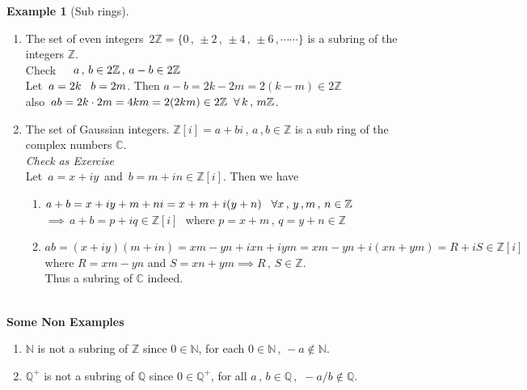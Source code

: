 \documentclass[11pt,a4paper]{article}
\theoremstyle{definition}
\newtheorem{exa}[thm]{Example}
\begin{document}
\begin{exa}[Sub rings]
\begin{enumerate}
\item The set of even integers $\, 2\mathbb{Z} = \big\{0\, , \, \pm 2\, , \, \pm 4\, , \, \pm 6\, , \cdots\cdots\}$ is a subring of the integers $\mathbb{Z}$.\\

Check $\hspace{0.4cm} a\, , \, b\in 2\mathbb{Z} \, , \, a-b\in 2\mathbb{Z}$\\

Let $\, a = 2k\hspace{0.3cm} b = 2m$. Then $a - b = 2k -2m = 2(k - m) \in 2\mathbb{Z}$\\ 
also $\, ab = 2k\cdot 2m = 4km = 2(2km) \in 2\mathbb{Z}\hspace{0.2cm} \forall \, k\, , \, m\mathbb{Z}$.\\


\item The set of Gaussian integers. $\mathbb{Z}[i] = a + bi\, , \, a\, , b\in \mathbb{Z}$ is a sub ring of the complex numbers $\mathbb{C}$.\\



\textit{Check as Exercise}\\
Let $\, a = x + iy\, $ and $\, b = m + i n\in \mathbb{Z}[i]$. Then we have 
\begin{enumerate}
\item $a + b = x + i y + m + ni = x + m + i(y+n) \hspace{0.3cm} \forall x\, , \, y\, , m\, , \, n\in \mathbb{Z}$
$\implies\, a + b = p  + i q\in \mathbb{Z}[i]\,\,$ where $p = x + m\, , \, q = y + n\in \mathbb{Z}$\\

\item $ab = (x + iy)(m + in) = xm - yn + ixn + iym = x m - yn + i(xn + ym) = R + iS\in \mathbb{Z}[i]$\\
where $R = xm - yn$ and $S = xn + ym\implies R\, , \, S\in \mathbb{Z}$.\\

Thus a subring of $\mathbb{C}$ indeed.\\\\
\end{enumerate}
\end{enumerate}
\end{exa}




\textbf{Some Non Examples}
\begin{enumerate}
\item $\mathbb{N}$ is not a subring of $\mathbb{Z}$ since $0\in \mathbb{N}$, for each $0\in \mathbb{N}\, , \, -a\not\in \mathbb{N}$.
\item $\mathbb{Q}^+$ is not a subring of $\mathbb{Q}$ since $0\in \mathbb{Q}^+$, for all $a\, , \, b\in \mathbb{Q}\, , \,\, -a/b\not\in \mathbb{Q}$.\\\\
\end{enumerate}
 
\end{document}
